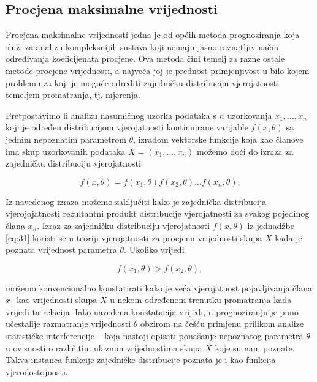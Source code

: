 \documentclass[a4paper,12pt,oneside]{memoir}
\begin{document}
            \subsection{Procjena maksimalne vrijednosti}
            \label{subs:ML}
                Procjena maksimalne vrijednosti jedna je od općih metoda prognoziranja koja služi za analizu kompleksnijih sustava koji nemaju jasno raznatljiv način određivanja koeficijenata procjene. Ova metoda čini temelj za razne ostale metode procjene vrijednosti, a najveća joj je prednost primjenjivost u bilo kojem problemu za koji je moguće odrediti zajedničku distribuciju vjerojatnosti temeljem promatranja, tj. mjerenja.

                Pretpostavimo li analizu nasumičnog uzorka podataka s $n$ uzorkovanja $x_1,\ldots,x_n$ koji je određen distribucijom vjerojatnosti kontinuirane varijable $f(x,\theta)$ sa jednim nepoznatim parametrom $\theta$, izradom vektorske funkcije koja kao članove ima skup uzorkovanih podataka $X=(x_1,\ldots,x_n)$ možemo doći do izraza za zajedničku distribuciju vjerojatnosti \cite{Priestley}

                \begin{equation}
                    f(x,\theta)=f(x_1,\theta)f(x_2,\theta)\ldots f(x_n,\theta).
                    \label{eq:31}
                \end{equation}

                Iz navedenog izraza možemo zaključiti kako je zajednička distribucija vjerojojatnosti rezultantni produkt distribucije vjerojatnosti za svakog pojedinog člana $x_n$. Izraz za zajedničku distribuciju vjerojatnosti $f(x,\theta)$ iz jednadžbe \eqref{eq:31} koristi se u teoriji vjerojatnosti za procjenu vrijednosti skupa $X$ kada je poznata vrijednost parametra $\theta$. Ukoliko vrijedi

                \begin{equation}
                    f(x_1,\theta)> f(x_2,\theta),
                    \label{eq:32}
                \end{equation}

                možemo konvencionalno konstatirati kako je veća vjerojatnost pojavljivanja člana $x_1$ kao vrijednosti skupa $X$ u nekom određenom trenutku promatranja kada vrijedi ta relacija. Iako navedena konstatacija vrijedi, u prognoziranju je puno učestalije razmatranje vrijednosti $\theta$ obzirom na češću primjenu prilikom analize statističke interferencije -- koja nastoji opisati ponašanje nepoznatog parametra $\theta$ u ovisnosti o različitim ulaznim vrijednostima skupa $X$ koje su nam poznate. Takva instanca funkcije zajedničke distribucije poznata je i kao funkcija vjerodostojnosti.
                
\end{document}
